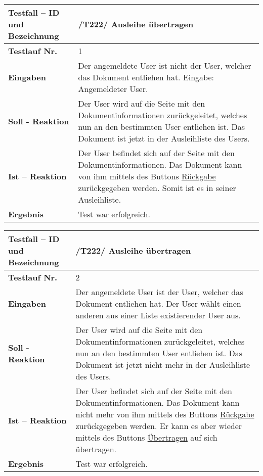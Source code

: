 \begin{longtable}{|p{5cm}|p{10cm}|}
\hline
\textbf{Testfall -- ID und Bezeichnung} & \textnormal{/T222/ Ausleihe übertragen} \\
\hline
\textbf{Testlauf Nr.} & \textnormal{1} \\
\hline
\textbf{Eingaben} & \textnormal{
Der angemeldete User ist nicht der User, welcher das Dokument
entliehen hat. Eingabe: Angemeldeter User.} \\
\hline
\textbf{Soll - Reaktion} & \textnormal{
Der User wird auf die Seite mit den Dokumentinformationen
zurückgeleitet, welches nun an den bestimmten User entliehen ist.
Das Dokument ist jetzt in der Ausleihliste des Users.
} \\
\hline
\textbf{Ist -- Reaktion} & \textnormal{
Der User befindet sich auf der Seite mit den Dokumentinformationen.
Das Dokument kann von ihm mittels des Buttons \uline{Rückgabe}
zurückgegeben werden. Somit ist es in seiner Ausleihliste.} \\
\hline
\textbf{Ergebnis} & \textnormal{
Test war erfolgreich.} \\
\hline
\end{longtable}

\begin{longtable}{|p{5cm}|p{10cm}|}
\hline
\textbf{Testfall -- ID und Bezeichnung} & \textnormal{/T222/ Ausleihe
übertragen} \\
\hline
\textbf{Testlauf Nr.} & \textnormal{2} \\
\hline
\textbf{Eingaben} & \textnormal{
Der angemeldete User ist der User, welcher das Dokument entliehen hat. Der
User wählt einen anderen aus einer Liste existierender User aus.} \\
\hline
\textbf{Soll - Reaktion} & \textnormal{
Der User wird auf die Seite mit den Dokumentinformationen
zurückgeleitet, welches nun an den bestimmten User entliehen ist.
Das Dokument ist jetzt nicht mehr in der Ausleihliste des Users.
} \\
\hline
\textbf{Ist -- Reaktion} & \textnormal{
Der User befindet sich auf der Seite mit den Dokumentinformationen.
Das Dokument kann nicht mehr von ihm mittels des Buttons \uline{Rückgabe}
zurückgegeben werden. Er kann es aber wieder mittels des Buttons
\uline{Übertragen} auf sich übertragen.} \\
\hline
\textbf{Ergebnis} & \textnormal{
Test war erfolgreich.} \\
\hline
\end{longtable}


